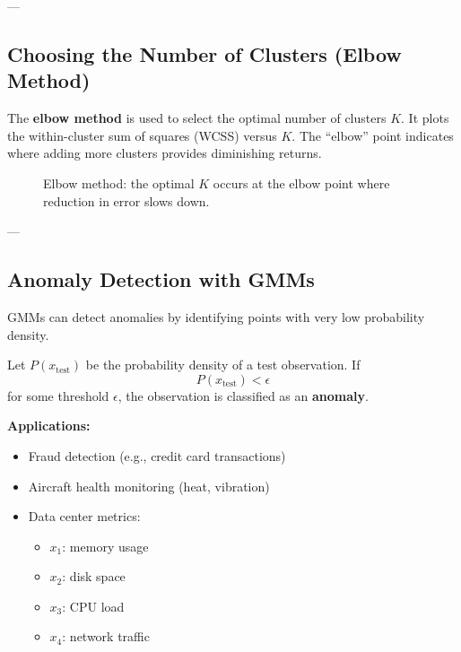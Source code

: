 ---

\subsection{Choosing the Number of Clusters (Elbow Method)}

The \textbf{elbow method} is used to select the optimal number of clusters \( K \). It plots the within-cluster sum of squares (WCSS) versus \( K \).  
The ``elbow'' point indicates where adding more clusters provides diminishing returns.

\begin{figure}[h]
\centering
{}
\caption{Elbow method: the optimal $K$ occurs at the elbow point where reduction in error slows down.}
\end{figure}

---

\subsection{Anomaly Detection with GMMs}

GMMs can detect anomalies by identifying points with very low probability density.

Let \( P(x_{\text{test}}) \) be the probability density of a test observation.  
If
\[
P(x_{\text{test}}) < \epsilon
\]
for some threshold \( \epsilon \), the observation is classified as an \textbf{anomaly}.

\textbf{Applications:}
\begin{itemize}
    \item Fraud detection (e.g., credit card transactions)
    \item Aircraft health monitoring (heat, vibration)
    \item Data center metrics:
    \begin{itemize}
        \item \( x_1 \): memory usage
        \item \( x_2 \): disk space
        \item \( x_3 \): CPU load
        \item \( x_4 \): network traffic
    \end{itemize}
\end{itemize}

